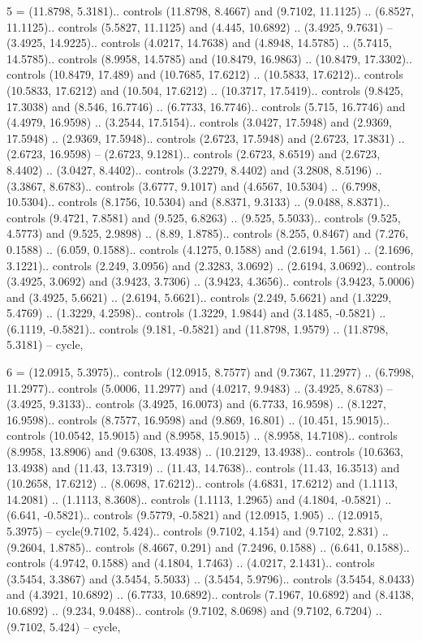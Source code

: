 5 = {(11.8798, 5.3181).. controls (11.8798, 8.4667) and (9.7102, 11.1125) .. (6.8527, 11.1125).. controls (5.5827, 11.1125) and (4.445, 10.6892) .. (3.4925, 9.7631) -- (3.4925, 14.9225).. controls (4.0217, 14.7638) and (4.8948, 14.5785) .. (5.7415, 14.5785).. controls (8.9958, 14.5785) and (10.8479, 16.9863) .. (10.8479, 17.3302).. controls (10.8479, 17.489) and (10.7685, 17.6212) .. (10.5833, 17.6212).. controls (10.5833, 17.6212) and (10.504, 17.6212) .. (10.3717, 17.5419).. controls (9.8425, 17.3038) and (8.546, 16.7746) .. (6.7733, 16.7746).. controls (5.715, 16.7746) and (4.4979, 16.9598) .. (3.2544, 17.5154).. controls (3.0427, 17.5948) and (2.9369, 17.5948) .. (2.9369, 17.5948).. controls (2.6723, 17.5948) and (2.6723, 17.3831) .. (2.6723, 16.9598) -- (2.6723, 9.1281).. controls (2.6723, 8.6519) and (2.6723, 8.4402) .. (3.0427, 8.4402).. controls (3.2279, 8.4402) and (3.2808, 8.5196) .. (3.3867, 8.6783).. controls (3.6777, 9.1017) and (4.6567, 10.5304) .. (6.7998, 10.5304).. controls (8.1756, 10.5304) and (8.8371, 9.3133) .. (9.0488, 8.8371).. controls (9.4721, 7.8581) and (9.525, 6.8263) .. (9.525, 5.5033).. controls (9.525, 4.5773) and (9.525, 2.9898) .. (8.89, 1.8785).. controls (8.255, 0.8467) and (7.276, 0.1588) .. (6.059, 0.1588).. controls (4.1275, 0.1588) and (2.6194, 1.561) .. (2.1696, 3.1221).. controls (2.249, 3.0956) and (2.3283, 3.0692) .. (2.6194, 3.0692).. controls (3.4925, 3.0692) and (3.9423, 3.7306) .. (3.9423, 4.3656).. controls (3.9423, 5.0006) and (3.4925, 5.6621) .. (2.6194, 5.6621).. controls (2.249, 5.6621) and (1.3229, 5.4769) .. (1.3229, 4.2598).. controls (1.3229, 1.9844) and (3.1485, -0.5821) .. (6.1119, -0.5821).. controls (9.181, -0.5821) and (11.8798, 1.9579) .. (11.8798, 5.3181) -- cycle},

6 = {(12.0915, 5.3975).. controls (12.0915, 8.7577) and (9.7367, 11.2977) .. (6.7998, 11.2977).. controls (5.0006, 11.2977) and (4.0217, 9.9483) .. (3.4925, 8.6783) -- (3.4925, 9.3133).. controls (3.4925, 16.0073) and (6.7733, 16.9598) .. (8.1227, 16.9598).. controls (8.7577, 16.9598) and (9.869, 16.801) .. (10.451, 15.9015).. controls (10.0542, 15.9015) and (8.9958, 15.9015) .. (8.9958, 14.7108).. controls (8.9958, 13.8906) and (9.6308, 13.4938) .. (10.2129, 13.4938).. controls (10.6363, 13.4938) and (11.43, 13.7319) .. (11.43, 14.7638).. controls (11.43, 16.3513) and (10.2658, 17.6212) .. (8.0698, 17.6212).. controls (4.6831, 17.6212) and (1.1113, 14.2081) .. (1.1113, 8.3608).. controls (1.1113, 1.2965) and (4.1804, -0.5821) .. (6.641, -0.5821).. controls (9.5779, -0.5821) and (12.0915, 1.905) .. (12.0915, 5.3975) -- cycle(9.7102, 5.424).. controls (9.7102, 4.154) and (9.7102, 2.831) .. (9.2604, 1.8785).. controls (8.4667, 0.291) and (7.2496, 0.1588) .. (6.641, 0.1588).. controls (4.9742, 0.1588) and (4.1804, 1.7463) .. (4.0217, 2.1431).. controls (3.5454, 3.3867) and (3.5454, 5.5033) .. (3.5454, 5.9796).. controls (3.5454, 8.0433) and (4.3921, 10.6892) .. (6.7733, 10.6892).. controls (7.1967, 10.6892) and (8.4138, 10.6892) .. (9.234, 9.0488).. controls (9.7102, 8.0698) and (9.7102, 6.7204) .. (9.7102, 5.424) -- cycle},

